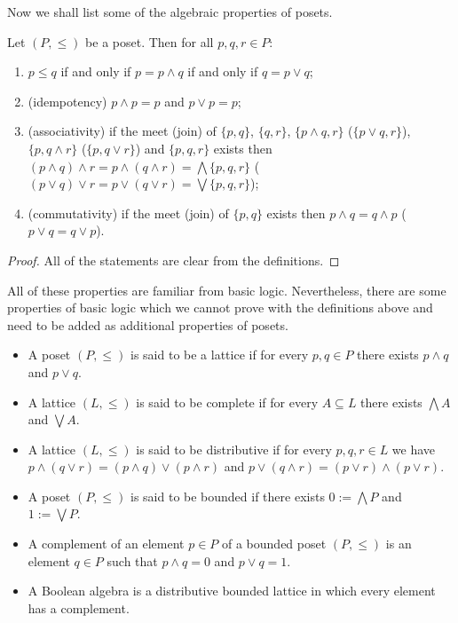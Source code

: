 Now we shall list some of the algebraic properties of posets.

\begin{theorem}\label{thm:logic_algebra}
Let $(P,\leq)$ be a poset. Then for all $p,q,r\in P$:
\begin{enumerate}
\item $p\leq q$ if and only if $p=p\wedge q$ if and only if $q =p\vee q$;
\item (idempotency) $p\wedge p = p$ and $p\vee p=p$;
\item (associativity) if the meet (join) of $\{p,q\}$, $\{q,r\}$, $\{p\wedge q, r\}$ ($\{p\vee q, r\}$), $\{p,q\wedge r\}$ ($\{p,q\vee r\}$) and $\{p,q,r\}$ exists then $(p\wedge q)\wedge r=p\wedge(q\wedge r)=\bigwedge \{p, q, r\}$ ($(p\vee q)\vee r=p\vee(q\vee r)=\bigvee \{p, q, r\}$);
\item (commutativity) if the meet (join) of $\{p,q\}$ exists then $p\wedge q = q\wedge p$ ($p\vee q = q\vee p$).
\end{enumerate}
\end{theorem}
\begin{proof}
All of the statements are clear from the definitions.
\end{proof}

All of these properties are familiar from basic logic. Nevertheless, there are some properties of basic logic which we cannot prove with the definitions above and need to be added as additional properties of posets.

\begin{definition}

\begin{itemize}
\item A poset $(P,\leq)$ is said to be a lattice if for every $p,q\in P$ there exists $p\wedge q$ and $p\vee q$.
\item A lattice $(L,\leq)$ is said to be complete if for every $A\subseteq L$ there exists $\bigwedge A$ and $\bigvee A$.
\item A lattice $(L,\leq)$ is said to be distributive if for every $p,q,r\in L$ we have $p\wedge (q\vee r)=(p\wedge q)\vee (p\wedge r)$ and $p\vee (q\wedge r)=(p\vee r)\wedge (p\vee r)$.
\item A poset $(P,\leq)$ is said to be bounded if there exists $0:=\bigwedge P$ and $1:=\bigvee P$.
\item A complement of an element $p\in P$ of a bounded poset $(P,\leq)$ is an element $q\in P$ such that $p\wedge q = 0$ and $p\vee q = 1$.
\item A Boolean algebra is a distributive bounded lattice in which every element has a complement.  
\end{itemize}

\end{definition}

